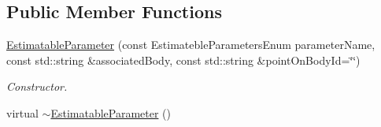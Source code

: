 \subsection*{Public Member Functions}
\begin{DoxyCompactItemize}
\item 
\hyperlink{classtudat_1_1estimatable__parameters_1_1EstimatableParameter_a4012bde7f5f26c5c590c0a149283dd4d}{Estimatable\+Parameter} (const Estimateble\+Parameters\+Enum parameter\+Name, const std\+::string \&associated\+Body, const std\+::string \&point\+On\+Body\+Id=\char`\"{}\char`\"{})
\begin{DoxyCompactList}\small\item\em Constructor. \end{DoxyCompactList}\item 
virtual \hyperlink{classtudat_1_1estimatable__parameters_1_1EstimatableParameter_a211a379e14476e36a7693f43be29cb11}{$\sim$\+Estimatable\+Parameter} ()\hypertarget{classtudat_1_1estimatable__parameters_1_1EstimatableParameter_a211a379e14476e36a7693f43be29cb11}{}\label{classtudat_1_1estimatable__parameters_1_1EstimatableParameter_a211a379e14476e36a7693f43be29cb11}


\end{DoxyCompactItemize}
